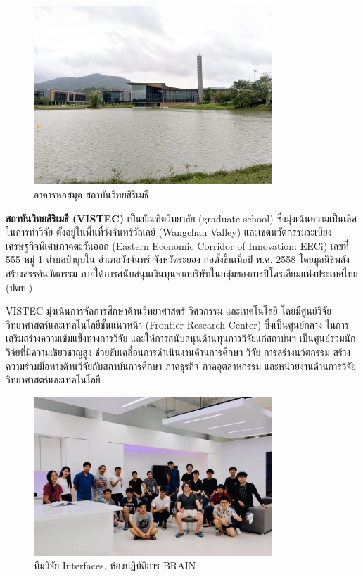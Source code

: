 \documentclass[16pt,a4]{internshipreport}
\begin{document}
\begin{figure}[H]
    \centering
    \includegraphics[width=0.8\textwidth]{images/vistec_v.jpg}
    \caption{อาคารหอสมุด สถาบันวิทยสิริเมธี}
\end{figure}

\textbf{สถาบันวิทยสิริเมธี (VISTEC)} เป็นบัณฑิตวิทยาลัย (graduate school) ซึ่งมุ่งเน้นความเป็นเลิศในการทำวิจัย ตั้งอยู่ในพื้นที่วังจันทร์วัลเลย์ (Wangchan Valley) และเขตนวัตกรรมระเบียงเศรษฐกิจพิเศษภาคตะวันออก (Eastern Economic Corridor of Innovation: EECi) เลขที่ 555 หมู่ 1 ตำบลป่ายุบใน อำเภอวังจันทร์ จังหวัดระยอง ก่อตั้งขึ้นเมื่อปี พ.ศ. 2558 โดยมูลนิธิพลังสร้างสรรค์นวัตกรรม ภายใต้การสนับสนุนเงินทุนจากบริษัทในกลุ่มของการปิโตรเลียมแห่งประเทศไทย (ปตท.)

VISTEC มุ่งเน้นการจัดการศึกษาด้านวิทยาศาสตร์ วิศวกรรม และเทคโนโลยี โดยมีศูนย์วิจัยวิทยาศาสตร์และเทคโนโลยีชั้นแนวหน้า (Frontier Research Center) ซึ่งเป็นศูนย์กลาง ในการเสริมสร้างความเข้มแข็งทางการวิจัย และให้การสนับสนุนด้านทุนการวิจัยแก่สถาบันฯ เป็นศูนย์รวมนักวิจัยที่มีความเชี่ยวชาญสูง ช่วยขับเคลื่อนการดำเนินงานด้านการศึกษา วิจัย การสร้างนวัตกรรม สร้างความร่วมมือทางด้านวิจัยกับสถาบันการศึกษา ภาคธุรกิจ ภาคอุตสาหกรรม
และหน่วยงานด้านการวิจัยวิทยาศาสตร์และเทคโนโลยี \cite{wiki-vistec}

\begin{figure}[H]
    \centering
    \includegraphics[width=0.8\textwidth]{images/brain_team_2019.jpg}
    \caption{ทีมวิจัย Interfaces, ห้องปฏิบัติการ BRAIN}
\end{figure}
\end{document}
